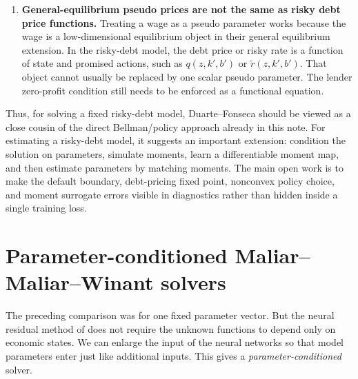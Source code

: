 \documentclass[11pt]{article}
\newcommand{\1}{\mathbf{1}}
\begin{document}
\begin{enumerate}[leftmargin=2em]
  \item \textbf{General-equilibrium pseudo prices are not the same as risky debt
  price functions.} Treating a wage as a pseudo parameter works because the wage
  is a low-dimensional equilibrium object in their general equilibrium
  extension. In the risky-debt model, the debt price or risky rate is a function
  of state and promised actions, such as \(q(z,k',b')\) or
  \(\widetilde r(z,k',b')\). That object cannot usually be replaced by one
  scalar pseudo parameter. The lender zero-profit condition still needs to be
  enforced as a functional equation.
\end{enumerate}

Thus, for solving a fixed risky-debt model, Duarte--Fonseca should be viewed as
a close cousin of the direct Bellman/policy approach already in this note. For
estimating a risky-debt model, it suggests an important extension: condition the
solution on parameters, simulate moments, learn a differentiable moment map, and
then estimate parameters by matching moments. The main open work is to make the
default boundary, debt-pricing fixed point, nonconvex policy choice, and moment
surrogate errors visible in diagnostics rather than hidden inside a single
training loss.

\section{Parameter-conditioned Maliar--Maliar--Winant solvers}
\label{sec:parameter-conditioned-solver}

The preceding comparison was for one fixed parameter vector. But the neural
residual method of \citet{maliar2021deep} does not require the unknown
functions to depend only on economic states. We can enlarge the input of the
neural networks so that model parameters enter just like additional inputs.
This gives a \emph{parameter-conditioned} solver.
\end{document}
